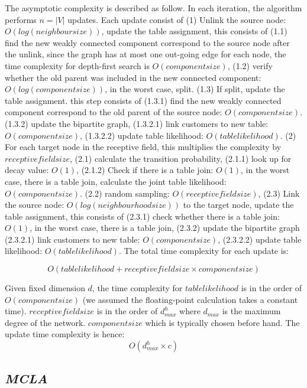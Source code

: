 The asymptotic complexity is described as follow. In each iteration, the algorithm performs $n = |V|$ updates. Each update consist of (1) Unlink the source node: $O(log(neighbour size))$, update the table assignment, this consists of (1.1) find the new weakly connected component correspond to the source node after the unlink, since the graph has at most one out-going edge for each node, the time complexity for depth-first search is $O(component size)$, (1.2) verify whether the old parent was included in the new connected component: $O(log(component size))$, in the worst case, split. (1.3) If split, update the table assignment. this step consists of (1.3.1) find the new weakly connected component correspond to the old parent of the source node: $O(component size)$. (1.3.2) update the bipartite graph, (1.3.2.1) link customers to new table: $O(component size)$, (1.3.2.2) update table likelihood: $O(table likelihood)$. (2) For each target node in the receptive field, this multiplies the complexity by $receptive field size$, (2.1) calculate the transition probability, (2.1.1) look up for decay value: $O(1)$, (2.1.2) Check if there is a table join: $O(1)$, in the worst case, there is a table join, calculate the joint table likelihood: $O(component size)$. (2.2) random sampling: $O(receptive field size)$, (2.3) Link the source node: $O(log(neighbourhood size))$ to the target node, update the table assignment, this consists of (2.3.1) check whether there is a table join: $O(1)$, in the worst case, there is a table join, (2.3.2) update the bipartite graph (2.3.2.1) link customers to new table: $O(component size)$, (2.3.2.2) update table likelihood: $O(table likelihood)$. The total time complexity for each update is:

\begin{equation}
    O(table likelihood + receptive field size \times component size)
\end{equation}

Given fixed dimension $d$, the time complexity for $table likelihood$ is in the order of $O(component size)$ (we assumed the floating-point calculation takes a constant time). $receptive field size$ is in the order of $d_{max}^h$ where $d_{max}$ is the maximum degree of the network. $component size$ which is typically chosen before hand. The update time complexity is hence:
\begin{equation}
    O(d_{max}^h \times c)
\end{equation}

\newpage
\subsection{\emph{MCLA}}

